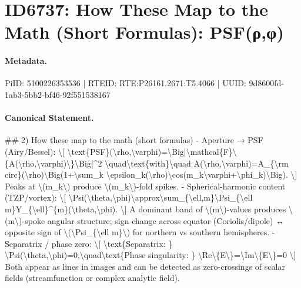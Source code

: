 \section*{ID6737: How These Map to the Math (Short Formulas): PSF(ρ,φ)}
\paragraph{Metadata.}
PiID: 5100226353536 | RTEID: RTE:P26161.2671:T5.4066 | UUID: 9d8600fd-1ab3-5bb2-bf46-92f551538167

\paragraph{Canonical Statement.}
\#\# 2) How these map to the math (short formulas) - Aperture → PSF (Airy/Bessel): \textbackslash{}[ \textbackslash{}text\{PSF\}(\textbackslash{}rho,\textbackslash{}varphi)=\textbackslash{}Big|\textbackslash{}mathcal\{F\}\textbackslash{}\{A(\textbackslash{}rho,\textbackslash{}varphi)\textbackslash{}\}\textbackslash{}Big|\textasciicircum{}2 \textbackslash{}quad\textbackslash{}text\{with\}\textbackslash{}quad A(\textbackslash{}rho,\textbackslash{}varphi)=A\_\{\textbackslash{}rm circ\}(\textbackslash{}rho)\textbackslash{}Big(1+\textbackslash{}sum\_k \textbackslash{}epsilon\_k(\textbackslash{}rho)\textbackslash{}cos(m\_k\textbackslash{}varphi+\textbackslash{}phi\_k)\textbackslash{}Big). \textbackslash{}] Peaks at \textbackslash{}(m\_k\textbackslash{}) produce \textbackslash{}(m\_k\textbackslash{})-fold spikes. - Spherical-harmonic content (TZP/vortex): \textbackslash{}[ \textbackslash{}Psi(\textbackslash{}theta,\textbackslash{}phi)\textbackslash{}approx\textbackslash{}sum\_\{\textbackslash{}ell,m\}\textbackslash{}Psi\_\{\textbackslash{}ell m\}Y\_\{\textbackslash{}ell\}\textasciicircum{}\{m\}(\textbackslash{}theta,\textbackslash{}phi). \textbackslash{}] A dominant band of \textbackslash{}(m\textbackslash{})-values produces \textbackslash{}(m\textbackslash{})-spoke angular structure; sign change across equator (Coriolis/dipole) ↔ opposite sign of \textbackslash{}(\textbackslash{}Psi\_\{\textbackslash{}ell m\}\textbackslash{}) for northern vs southern hemispheres. - Separatrix / phase zero: \textbackslash{}[ \textbackslash{}text\{Separatrix: \} \textbackslash{}Psi(\textbackslash{}theta,\textbackslash{}phi)=0,\textbackslash{}quad\textbackslash{}text\{Phase singularity: \} \textbackslash{}Re\textbackslash{}\{E\textbackslash{}\}=\textbackslash{}Im\textbackslash{}\{E\textbackslash{}\}=0 \textbackslash{}] Both appear as lines in images and can be detected as zero-crossings of scalar fields (streamfunction or complex analytic field).

